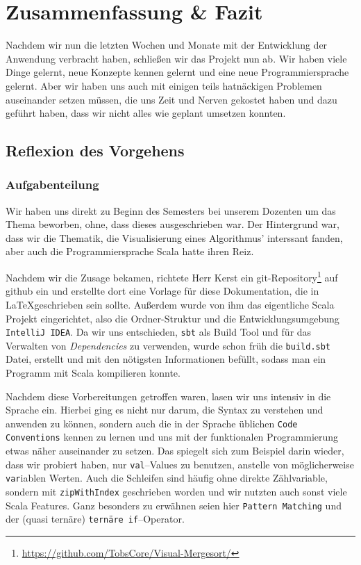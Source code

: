 \chapter{Zusammenfassung \& Fazit}\label{chap:zusammenfassung-und-fazit}
Nachdem wir nun die letzten Wochen und Monate mit der Entwicklung der Anwendung verbracht haben, schließen wir das Projekt nun ab. Wir haben viele Dinge gelernt, neue Konzepte kennen gelernt und eine neue Programmiersprache gelernt. Aber wir haben uns auch mit einigen teils hatnäckigen Problemen auseinander setzen müssen, die uns Zeit und Nerven gekostet haben und dazu geführt haben, dass wir nicht alles wie geplant umsetzen konnten.

\section{Reflexion des Vorgehens}\label{sec:reflexion}
\subsection{Aufgabenteilung}
Wir haben uns direkt zu Beginn des Semesters bei unserem Dozenten um das Thema beworben, ohne, dass dieses ausgeschrieben war. Der Hintergrund war, dass wir die Thematik, die Visualisierung eines Algorithmus' interssant fanden, aber auch die Programmiersprache Scala hatte ihren Reiz.

Nachdem wir die Zusage bekamen, richtete Herr Kerst ein git-Repository\footnote{\url{https://github.com/TobsCore/Visual-Mergesort/}} auf github ein und erstellte dort eine Vorlage für diese Dokumentation, die in \LaTeX geschrieben sein sollte. Außerdem wurde von ihm das eigentliche Scala Projekt eingerichtet, also die Ordner-Struktur und die Entwicklungsumgebung \texttt{IntelliJ IDEA}. Da wir uns entschieden, \texttt{sbt} als Build Tool und für das Verwalten von \textit{Dependencies} zu verwenden, wurde schon früh die \texttt{build.sbt} Datei, erstellt und mit den nötigsten Informationen befüllt, sodass man ein Programm mit Scala kompilieren konnte.

Nachdem diese Vorbereitungen getroffen waren, lasen wir uns intensiv in die Sprache ein. Hierbei ging es nicht nur darum, die Syntax zu verstehen und anwenden zu können, sondern auch die in der Sprache üblichen \texttt{Code Conventions} kennen zu lernen und uns mit der funktionalen Programmierung etwas näher auseinander zu setzen. Das spiegelt sich zum Beispiel darin wieder, dass wir probiert haben, nur \texttt{val}--Values zu benutzen, anstelle von möglicherweise \texttt{var}iablen Werten. Auch die Schleifen sind häufig ohne direkte Zählvariable, sondern mit \texttt{zipWithIndex} geschrieben worden und wir nutzten auch sonst viele Scala Features. Ganz besonders zu erwähnen seien hier \texttt{Pattern Matching} und der (quasi ternäre) \texttt{ternäre if}--Operator.

